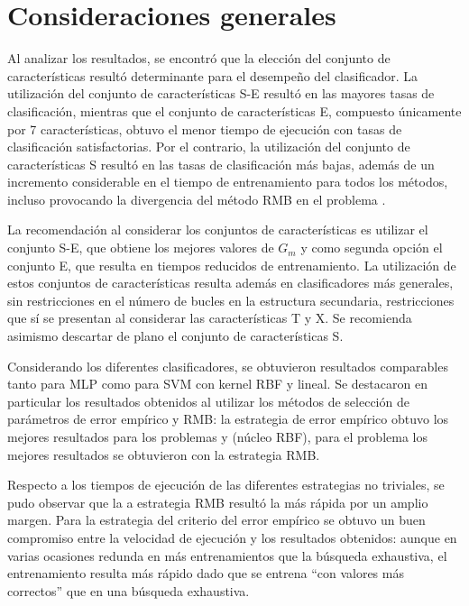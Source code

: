 \section{Consideraciones generales}
Al analizar los resultados, se encontró que la elección del conjunto
de características resultó determinante para el desempeño del
clasificador. La utilización del conjunto de características S-E
resultó en las mayores tasas de clasificación, mientras que el
conjunto de características E, compuesto únicamente por 7
características, obtuvo el menor tiempo de ejecución con tasas de
clasificación satisfactorias.  Por el contrario, la utilización del
conjunto de características S resultó en las tasas de clasificación
más bajas, además de un incremento considerable en el tiempo de
entrenamiento para todos los métodos, incluso provocando la
divergencia del método RMB en el problema \micropred{}.

La recomendación al considerar los conjuntos de características es
utilizar el conjunto S-E, que obtiene los mejores valores de $G_m$ y
como segunda opción el conjunto E, que resulta en tiempos reducidos de
entrenamiento.  La utilización de estos conjuntos de características
resulta además en clasificadores más generales, sin restricciones en
el número de bucles en la estructura secundaria, restricciones que sí
se presentan al considerar las características T y X.  Se recomienda
asimismo descartar de plano el conjunto de características S.

Considerando los diferentes clasificadores, se obtuvieron resultados
comparables tanto para MLP como para SVM con kernel RBF y lineal.  Se
destacaron en particular los resultados obtenidos al utilizar los
métodos de selección de parámetros de error empírico y RMB: la
estrategia de error empírico obtuvo los mejores resultados para los
problemas \mipred{} y \micropred{} (núcleo RBF), para el problema
\tripletsvm{} los mejores resultados se obtuvieron con la estrategia
RMB.

Respecto a los tiempos de ejecución de las diferentes estrategias no
triviales, se pudo observar que la a estrategia RMB resultó la más
rápida por un amplio margen.  Para la estrategia del criterio del
error empírico se obtuvo un buen compromiso entre la velocidad de
ejecución y los resultados obtenidos: aunque en varias ocasiones
redunda en más entrenamientos que la búsqueda exhaustiva, el
entrenamiento resulta más rápido dado que se entrena ``con valores más
correctos'' que en una búsqueda exhaustiva.